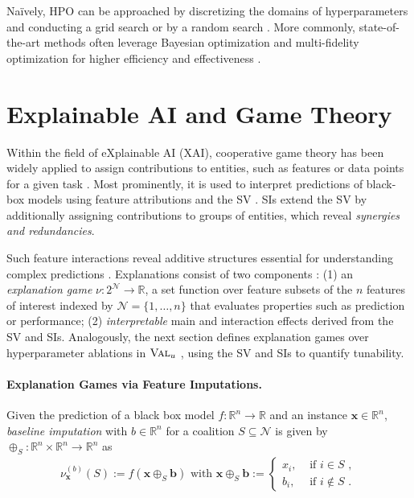 \documentclass[letterpaper]{article} %
\begin{document}
Na{\"i}vely, HPO can be approached by discretizing the domains of hyperparameters and conducting a grid search or by a random search \citep{Bergstra-jair12a}. More commonly, state-of-the-art methods often leverage Bayesian optimization and multi-fidelity optimization for higher efficiency and effectiveness \citep{DBLP:journals/widm/BischlBLPRCTUBBDL23}.


\section{Explainable AI and Game Theory}\label{sec:background-shapley}

Within the field of eXplainable AI (XAI), cooperative game theory has been widely applied to assign contributions to entities, such as features or data points for a given task \citep{DBLP:conf/ijcai/RozemberczkiWBY22}.
Most prominently, it is used to interpret predictions of black-box models using feature attributions \citep{Lundberg.2017} and the \gls*{SV} \citep{Shapley.1953}.
\glspl*{SI} \citep{Grabisch.1999} extend the \gls*{SV} by additionally assigning contributions to groups of entities, which reveal \emph{synergies and redundancies}.

Such feature interactions reveal additive structures essential for understanding complex predictions \citep{Sundararajan.2020}.
Explanations consist of two components \citep{Fumagalli.2024a}: (1) an \emph{explanation game} $\nu: 2^{\mathcal{N}} \to \mathbb{R}$, a set function over feature subsets of the $n$ features of interest indexed by $\mathcal N = \{1,\dots,n\}$ that evaluates properties such as prediction or performance; (2) \emph{interpretable} main and interaction effects derived from the \gls*{SV} and \glspl*{SI}.
Analogously, the next section defines explanation games over hyperparameter ablations in $\textsc{Val}_u$ , using the \gls*{SV} and \glspl*{SI} to quantify tunability.

\paragraph{Explanation Games via Feature Imputations.}
Given the prediction of a black box model $f: \mathbb{R}^n \to \mathbb{R}$ and an instance $\mathbf{x} \in \mathbb{R}^n$, \emph{baseline imputation} with $b \in \mathbb{R}^n$ for a coalition $S \subseteq \mathcal N$ is given by $\oplus_S: \mathbb{R}^n \times \mathbb{R}^n \to \mathbb{R}^n$ as
\begin{align*}
    \nu_{\mathbf{x}}^{(b)}(S) := f(\mathbf{x} \oplus_S \mathbf{b}) \text{ with } \mathbf{x} \oplus_S \mathbf{b} := \begin{cases}
        x_i, &\text{ if } i \in S \, \, , \\
        b_i, &\text{ if } i \notin S \, \, .
    \end{cases}
\end{align*}
\end{document}
